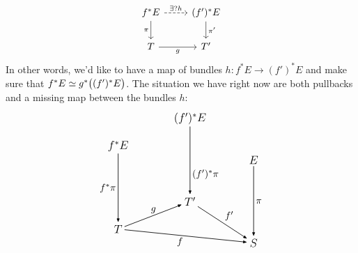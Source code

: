 \documentclass[12pt]{memoir}
\begin{document}
\begin{ptcb}
\[\begin{tikzcd}
        f^\ast E \arrow[r, "\exists?h", dashed] \arrow[d, "\pi"'] & (f')^\ast E \arrow[d, "\pi'"] \\
        T \arrow[r, "g"']                    & T'                      
    \end{tikzcd}  
    \]
    In other words, we'd like to have a map of bundles \(h: f^\ast E\to (f')^\ast E\) and make sure that \(f^*E\simeq g^*\bigl((f')^*E\bigr)\). The situation we have right now are both pullbacks and a missing map between the bundles \(h\):
    \[
    \begin{tikzpicture}[
        arrows={-{Latex[length=1.6mm]}},
        line width=.6pt,
        every node/.style={inner sep=2pt,font=\large}
    ]
        \node (Ef)  at (0,2)       {$f^*E$};
        \node (Efp) at (2.6,3)     {$(f')^*E$};
        \node (E)   at (4.9,1.5)   {$E$};
        \node (T)   at (0,-1)      {$T$};
        \node (Tp)  at (2.6,0)     {$T'$};
        \node (S)   at (4.9,-1.5)  {$S$};
    
        \begin{scope}[every node/.append style={font=\normalsize}]
        \draw (Ef)  -- node[left] {$f^*\pi$} (T);
        \draw (Efp) -- node[pos=.70,right] {$(f')^*\pi$} (Tp);
        \draw (E)   -- node[right] {$\pi$} (S);
    
        \draw (T)  -- node[above] {$g$} (Tp);
        \draw (Tp) -- node[above right] {$f'$} (S);
        \draw (T)  -- node[pos=.45,below] {$f$} (S);
    

\end{scope}
\end{tikzpicture}\]
\end{ptcb}
\end{document}
